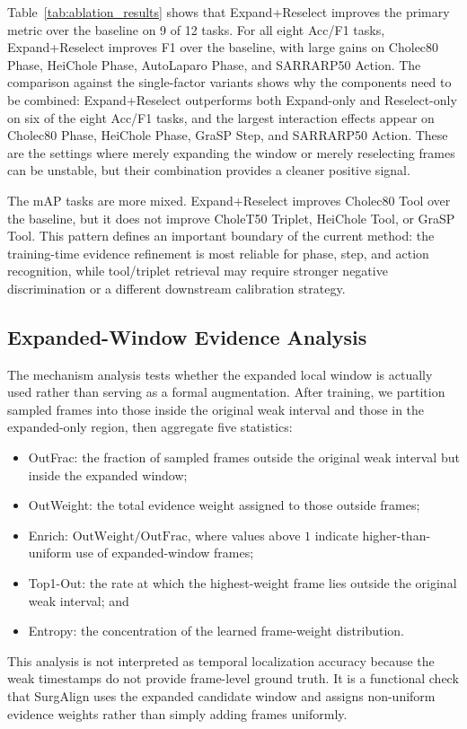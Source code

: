 Table~\ref{tab:ablation_results} shows that Expand+Reselect improves the primary metric over the baseline on 9 of 12 tasks. For all eight Acc/F1 tasks, Expand+Reselect improves F1 over the baseline, with large gains on Cholec80 Phase, HeiChole Phase, AutoLaparo Phase, and SARRARP50 Action. The comparison against the single-factor variants shows why the components need to be combined: Expand+Reselect outperforms both Expand-only and Reselect-only on six of the eight Acc/F1 tasks, and the largest interaction effects appear on Cholec80 Phase, HeiChole Phase, GraSP Step, and SARRARP50 Action. These are the settings where merely expanding the window or merely reselecting frames can be unstable, but their combination provides a cleaner positive signal.

The mAP tasks are more mixed. Expand+Reselect improves Cholec80 Tool over the baseline, but it does not improve CholeT50 Triplet, HeiChole Tool, or GraSP Tool. This pattern defines an important boundary of the current method: the training-time evidence refinement is most reliable for phase, step, and action recognition, while tool/triplet retrieval may require stronger negative discrimination or a different downstream calibration strategy.

\subsection{Expanded-Window Evidence Analysis}
\label{sec:exp_evidence}

The mechanism analysis tests whether the expanded local window is actually used rather than serving as a formal augmentation. After training, we partition sampled frames into those inside the original weak interval and those in the expanded-only region, then aggregate five statistics:
\begin{itemize}
    \item OutFrac: the fraction of sampled frames outside the original weak interval but inside the expanded window;
    \item OutWeight: the total evidence weight assigned to those outside frames;
    \item Enrich: $\mathrm{OutWeight}/\mathrm{OutFrac}$, where values above $1$ indicate higher-than-uniform use of expanded-window frames;
    \item Top1-Out: the rate at which the highest-weight frame lies outside the original weak interval; and
    \item Entropy: the concentration of the learned frame-weight distribution.
\end{itemize}
This analysis is not interpreted as temporal localization accuracy because the weak timestamps do not provide frame-level ground truth. It is a functional check that SurgAlign uses the expanded candidate window and assigns non-uniform evidence weights rather than simply adding frames uniformly.

